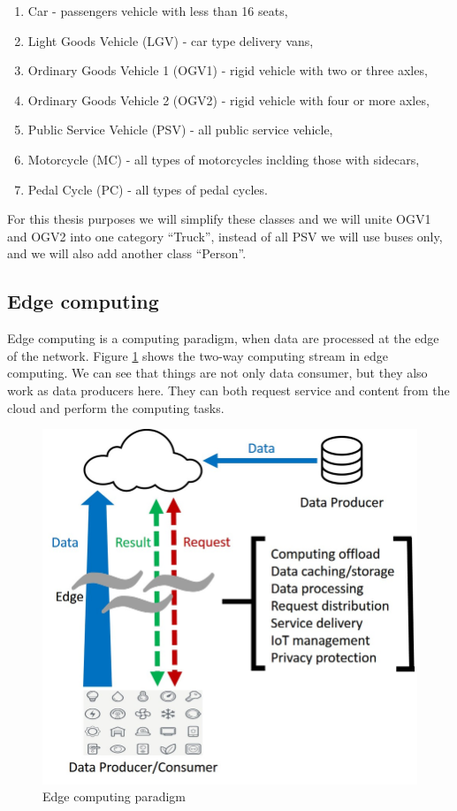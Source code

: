 \documentclass[twoside]{ctuthesis}
\theoremstyle{plain}
\theoremstyle{definition}
\theoremstyle{note}
\begin{document}
\begin{enumerate}
\item Car - passengers vehicle with less than 16 seats,
\item Light Goods Vehicle (LGV) - car type delivery vans,
\item Ordinary Goods Vehicle 1 (OGV1) - rigid vehicle with two or three axles,
\item Ordinary Goods Vehicle 2 (OGV2) - rigid vehicle with four or more axles,
\item Public Service Vehicle (PSV) - all public service vehicle,
\item Motorcycle (MC) - all types of motorcycles inclding those with sidecars,
\item Pedal Cycle (PC) - all types of pedal cycles.
\end{enumerate}

For this thesis purposes we will simplify these classes and we will unite OGV1 and OGV2 into one category ``Truck'', instead of all PSV we will use buses only, and we will also add another class ``Person''.
\subsection{Edge computing}
Edge computing is a computing paradigm, when data are processed at the edge of the network. Figure \ref{edge computing} shows the two-way computing stream in edge computing. We can see that things are not only data consumer, but they also work as data producers here. They can both request service and content from the cloud and perform the computing tasks. 

\begin{figure}[h]
\caption{Edge computing paradigm\cite{shi_cao_zhang_li_xu_2016}}
\label{edge computing}
\includegraphics[width=.7\textwidth]{images/introduction/Edge-computing-paradigm.png}
\end{figure}
\end{document}
